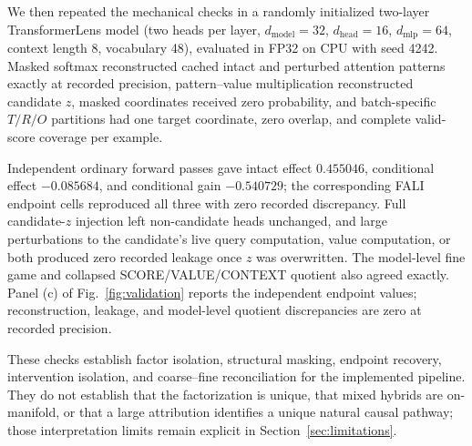 We then repeated the mechanical checks in a randomly initialized two-layer TransformerLens model (two heads per layer, $d_{\mathrm{model}}=32$, $d_{\mathrm{head}}=16$, $d_{\mathrm{mlp}}=64$, context length 8, vocabulary 48), evaluated in FP32 on CPU with seed 4242. Masked softmax reconstructed cached intact and perturbed attention patterns exactly at recorded precision, pattern--value multiplication reconstructed candidate $z$, masked coordinates received zero probability, and batch-specific $T/R/O$ partitions had one target coordinate, zero overlap, and complete valid-score coverage per example.

Independent ordinary forward passes gave intact effect $0.455046$, conditional effect $-0.085684$, and conditional gain $-0.540729$; the corresponding FALI endpoint cells reproduced all three with zero recorded discrepancy. Full candidate-$z$ injection left non-candidate heads unchanged, and large perturbations to the candidate's live query computation, value computation, or both produced zero recorded leakage once $z$ was overwritten. The model-level fine game and collapsed SCORE/VALUE/CONTEXT quotient also agreed exactly. Panel (c) of Fig.~\ref{fig:validation} reports the independent endpoint values; reconstruction, leakage, and model-level quotient discrepancies are zero at recorded precision.

These checks establish factor isolation, structural masking, endpoint recovery, intervention isolation, and coarse--fine reconciliation for the implemented pipeline. They do not establish that the factorization is unique, that mixed hybrids are on-manifold, or that a large attribution identifies a unique natural causal pathway; those interpretation limits remain explicit in Section~\ref{sec:limitations}.
